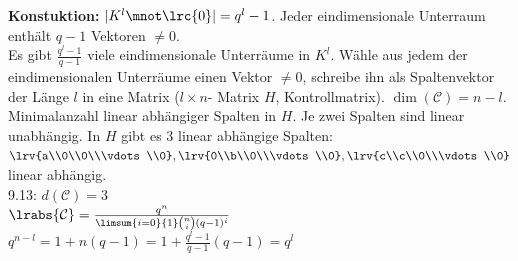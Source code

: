 		\textbf{Konstuktion:} $ |K^l\mnot\lrc{0}|=q^l-1 $. Jeder eindimensionale Unterraum enthält $ q-1 $ Vektoren $ \neq 0 $.\\
		Es gibt $ \frac{q^l-1}{q-1} $ viele eindimensionale Unterräume in $ K^l $. Wähle aus jedem der eindimensionalen Unterräume einen Vektor $ \neq 0 $, schreibe ihn als Spaltenvektor der Länge $ l $ in eine Matrix ($ l\times n $- Matrix $ H $, Kontrollmatrix). $ \dim(\mathcal{C})=n-l $.\\
		Minimalanzahl linear abhängiger Spalten in $ H $. Je zwei Spalten sind linear unabhängig. In $ H $ gibt es 3 linear abhängige Spalten:\\
		$ \lrv{a\\0\\0\\\vdots\\0},\lrv{0\\b\\0\\\vdots\\0},\lrv{c\\c\\0\\\vdots\\0} $ linear abhängig.\\
		9.13: $ d(\mathcal{C})=3 $\\
		$ \lrabs{\mathcal{C}}=\frac{q^n}{\limsum{i=0}{1}\binom{n}{i}(q-1)^i} $\\
		$ q^{n-l}=1+n(q-1)=1+\frac{q^l-1}{q-1}(q-1)=q^l $
	
